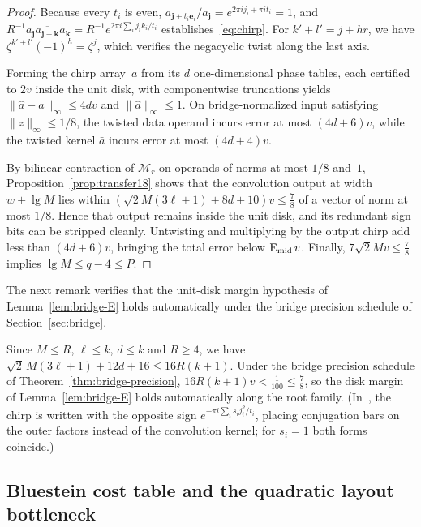 \begin{proof}
Because every $t_i$ is even, $a_{\mathbf j+t_i\mathbf e_i}/a_{\mathbf j}=e^{2\pi ij_i+\pi it_i}=1$, and $R^{-1}a_{\mathbf j}\overline{a_{\mathbf j-\mathbf k}}a_{\mathbf k}=R^{-1}e^{2\pi i\sum_ij_ik_i/t_i}$ establishes~\eqref{eq:chirp}. For $k'+l'=j+hr$, we have $\zeta^{k'+l'}(-1)^h=\zeta^j$, which verifies the negacyclic twist along the last axis.

Forming the chirp array~$a$ from its $d$ one-dimensional phase tables, each certified to $2v$ inside the unit disk, with componentwise truncations yields $\|\hat a-a\|_\infty\le4dv$ and $\|\hat a\|_\infty\le1$. On bridge-normalized input satisfying $\|z\|_\infty\le1/8$, the twisted data operand incurs error at most $(4d+6)v$, while the twisted kernel $\bar a$ incurs error at most $(4d+4)v$.

By bilinear contraction of $\mathcal M_r$ on operands of norms at most $1/8$ and~$1$, Proposition~\ref{prop:transfer18} shows that the convolution output at width $w+\lg M$ lies within $(\sqrt2M(3\ell+1)+8d+10)v\le\frac78$ of a vector of norm at most $1/8$. Hence that output remains inside the unit disk, and its redundant sign bits can be stripped cleanly. Untwisting and multiplying by the output chirp add less than $(4d+6)v$, bringing the total error below $\operatorname{E_{mid}} v$. Finally, $7\sqrt2Mv\le\frac78$ implies $\lg M\le q-4\le P$.
\end{proof}

The next remark verifies that the unit-disk margin hypothesis of Lemma~\ref{lem:bridge-E} holds automatically under the bridge precision schedule of Section~\ref{sec:bridge}.

\begin{remark}\label{rem:bluestein-margin}
Since $M\le R$, $\ell\le k$, $d\le k$ and $R\ge4$, we have $\sqrt2\,M(3\ell+1)+12d+16\le16R(k+1)$. Under the bridge
precision schedule of Theorem~\ref{thm:bridge-precision}, $16R(k+1)v<\frac1{100}\le\frac78$, so the disk margin of
Lemma~\ref{lem:bridge-E} holds automatically along the root family. (In~\cite[Lemma~21]{OAI26}, the chirp is written
with the opposite sign $e^{-\pi i\sum_is_ij_i^2/t_i}$, placing conjugation bars on the outer factors instead of the
convolution kernel; for $s_i=1$ both forms coincide.)
\end{remark}

\subsection{Bluestein cost table and the quadratic layout bottleneck}

